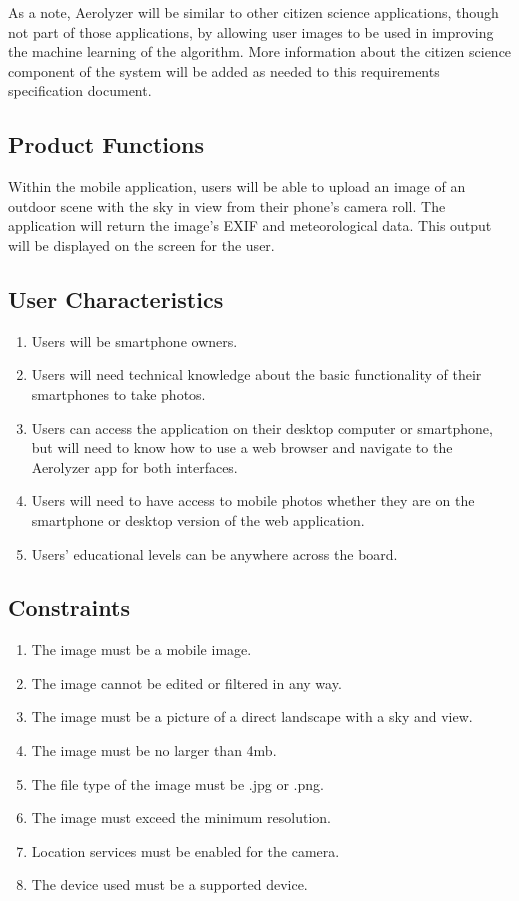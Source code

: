 \documentclass[letterpaper,10pt,draftclsnofoot,onecolumn]{IEEEtran}
\begin{document}
\begin{flushleft}
As a note, Aerolyzer will be similar to other citizen science applications, though not part of those applications, by allowing user images to be used in improving the machine learning of the algorithm.
More information about the citizen science component of the system will be added as needed to this requirements specification document.

\subsection{Product Functions}
Within the mobile application, users will be able to upload an image of an outdoor scene with the sky in view from their phone’s camera roll.
The application will return the image's EXIF and meteorological data. This output will be displayed on the screen for the user.

\subsection{User Characteristics}
\begin{enumerate}
	\item Users will be smartphone owners.
	\item Users will need technical knowledge about the basic functionality of their smartphones to take photos.
	\item Users can access the application on their desktop computer or smartphone, but will need to know how to use a web browser and navigate to the Aerolyzer app for both interfaces.
	\item Users will need to have access to mobile photos whether they are on the smartphone or desktop version of the web application.
	\item Users’ educational levels can be anywhere across the board.
\end{enumerate}

\subsection{Constraints}
\begin{enumerate}
        \item The image must be a mobile image.
        \item The image cannot be edited or filtered in any way.
        \item The image must be a picture of a direct landscape with a sky and view.
        \item The image must be no larger than 4mb.
        \item The file type of the image must be .jpg or .png.
        \item The image must exceed the minimum resolution.
        \item Location services must be enabled for the camera.
        \item The device used must be a supported device.
\end{enumerate}


\end{flushleft}
\end{document}
